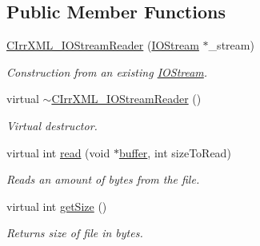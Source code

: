 \subsection*{Public Member Functions}
\begin{DoxyCompactItemize}
\item 
\hypertarget{class_assimp_1_1_c_irr_x_m_l___i_o_stream_reader_a5d0b13ea4a46fc699ae744860e07e0f9}{\hyperlink{class_assimp_1_1_c_irr_x_m_l___i_o_stream_reader_a5d0b13ea4a46fc699ae744860e07e0f9}{C\+Irr\+X\+M\+L\+\_\+\+I\+O\+Stream\+Reader} (\hyperlink{class_assimp_1_1_i_o_stream}{I\+O\+Stream} $\ast$\+\_\+stream)}\label{class_assimp_1_1_c_irr_x_m_l___i_o_stream_reader_a5d0b13ea4a46fc699ae744860e07e0f9}

\begin{DoxyCompactList}\small\item\em Construction from an existing \hyperlink{class_assimp_1_1_i_o_stream}{I\+O\+Stream}. \end{DoxyCompactList}\item 
\hypertarget{class_assimp_1_1_c_irr_x_m_l___i_o_stream_reader_a3e664d3291150d7f752e0d130fef8fb1}{virtual \hyperlink{class_assimp_1_1_c_irr_x_m_l___i_o_stream_reader_a3e664d3291150d7f752e0d130fef8fb1}{$\sim$\+C\+Irr\+X\+M\+L\+\_\+\+I\+O\+Stream\+Reader} ()}\label{class_assimp_1_1_c_irr_x_m_l___i_o_stream_reader_a3e664d3291150d7f752e0d130fef8fb1}

\begin{DoxyCompactList}\small\item\em Virtual destructor. \end{DoxyCompactList}\item 
virtual int \hyperlink{class_assimp_1_1_c_irr_x_m_l___i_o_stream_reader_acef5ac4ae18c425158c61d0c47e45247}{read} (void $\ast$\hyperlink{structbuffer}{buffer}, int size\+To\+Read)
\begin{DoxyCompactList}\small\item\em Reads an amount of bytes from the file. \end{DoxyCompactList}\item 
\hypertarget{class_assimp_1_1_c_irr_x_m_l___i_o_stream_reader_a623dd5e525d9776b657ee367764a184c}{virtual int \hyperlink{class_assimp_1_1_c_irr_x_m_l___i_o_stream_reader_a623dd5e525d9776b657ee367764a184c}{get\+Size} ()}\label{class_assimp_1_1_c_irr_x_m_l___i_o_stream_reader_a623dd5e525d9776b657ee367764a184c}

\begin{DoxyCompactList}\small\item\em Returns size of file in bytes. \end{DoxyCompactList}\end{DoxyCompactItemize}


